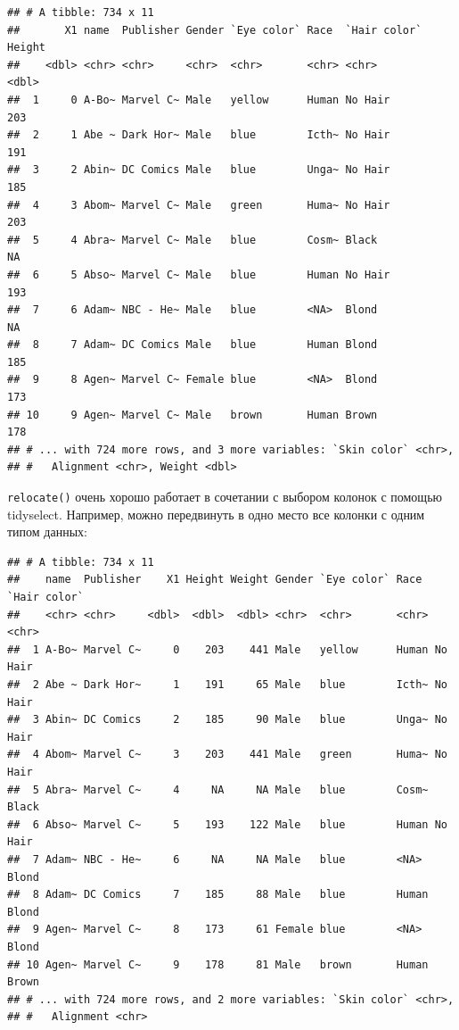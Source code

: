 \documentclass[]{book}
\newenvironment{Shaded}{\begin{snugshade}}{\end{snugshade}}
\newcommand{\KeywordTok}[1]{\textcolor[rgb]{0.13,0.29,0.53}{\textbf{#1}}}
\newcommand{\DataTypeTok}[1]{\textcolor[rgb]{0.13,0.29,0.53}{#1}}
\newcommand{\StringTok}[1]{\textcolor[rgb]{0.31,0.60,0.02}{#1}}
\newcommand{\OperatorTok}[1]{\textcolor[rgb]{0.81,0.36,0.00}{\textbf{#1}}}
\newcommand{\NormalTok}[1]{#1}
\begin{document}
\begin{verbatim}
## # A tibble: 734 x 11
##       X1 name  Publisher Gender `Eye color` Race  `Hair color` Height
##    <dbl> <chr> <chr>     <chr>  <chr>       <chr> <chr>         <dbl>
##  1     0 A-Bo~ Marvel C~ Male   yellow      Human No Hair         203
##  2     1 Abe ~ Dark Hor~ Male   blue        Icth~ No Hair         191
##  3     2 Abin~ DC Comics Male   blue        Unga~ No Hair         185
##  4     3 Abom~ Marvel C~ Male   green       Huma~ No Hair         203
##  5     4 Abra~ Marvel C~ Male   blue        Cosm~ Black            NA
##  6     5 Abso~ Marvel C~ Male   blue        Human No Hair         193
##  7     6 Adam~ NBC - He~ Male   blue        <NA>  Blond            NA
##  8     7 Adam~ DC Comics Male   blue        Human Blond           185
##  9     8 Agen~ Marvel C~ Female blue        <NA>  Blond           173
## 10     9 Agen~ Marvel C~ Male   brown       Human Brown           178
## # ... with 724 more rows, and 3 more variables: `Skin color` <chr>,
## #   Alignment <chr>, Weight <dbl>
\end{verbatim}

\texttt{relocate()} очень хорошо работает в сочетании с выбором колонок
с помощью tidyselect. Например, можно передвинуть в одно место все
колонки с одним типом данных:

\begin{Shaded}
\end{Shaded}

\begin{verbatim}
## # A tibble: 734 x 11
##    name  Publisher    X1 Height Weight Gender `Eye color` Race  `Hair color`
##    <chr> <chr>     <dbl>  <dbl>  <dbl> <chr>  <chr>       <chr> <chr>       
##  1 A-Bo~ Marvel C~     0    203    441 Male   yellow      Human No Hair     
##  2 Abe ~ Dark Hor~     1    191     65 Male   blue        Icth~ No Hair     
##  3 Abin~ DC Comics     2    185     90 Male   blue        Unga~ No Hair     
##  4 Abom~ Marvel C~     3    203    441 Male   green       Huma~ No Hair     
##  5 Abra~ Marvel C~     4     NA     NA Male   blue        Cosm~ Black       
##  6 Abso~ Marvel C~     5    193    122 Male   blue        Human No Hair     
##  7 Adam~ NBC - He~     6     NA     NA Male   blue        <NA>  Blond       
##  8 Adam~ DC Comics     7    185     88 Male   blue        Human Blond       
##  9 Agen~ Marvel C~     8    173     61 Female blue        <NA>  Blond       
## 10 Agen~ Marvel C~     9    178     81 Male   brown       Human Brown       
## # ... with 724 more rows, and 2 more variables: `Skin color` <chr>,
## #   Alignment <chr>
\end{verbatim}
\end{document}
